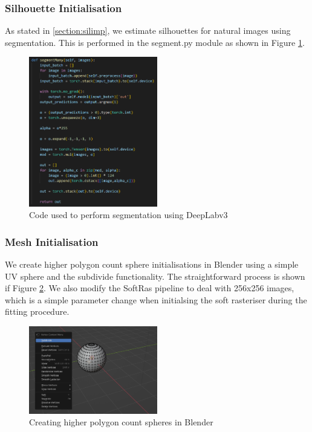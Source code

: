 \documentclass{article}
\begin{document}
\subsubsection{Silhouette Initialisation}

As stated in \ref{section:silimp}, we estimate silhouettes for natural images using segmentation. This is performed in the segment.py module as shown in Figure \ref{segment}. 

\begin{figure}[h!]
  \centering
  \includegraphics[width=0.5\textwidth]{images/segmentcode.png}
  \caption{Code used to perform segmentation using DeepLabv3}
  \label{segment}
\end{figure}

\subsubsection{Mesh Initialisation}

We create higher polygon count sphere initialisations in Blender using a simple UV sphere and the subdivide functionality. The straightforward process is shown if Figure \ref{blender}. We also modify the SoftRas pipeline to deal with 256x256 images, which is a simple parameter change when initialsing the soft rasteriser during the fitting procedure.

\begin{figure}[h!]
  \centering
  \includegraphics[width=0.5\textwidth]{images/blender.png}
  \caption{Creating higher polygon count spheres in Blender}
  \label{blender}
\end{figure}
\end{document}
